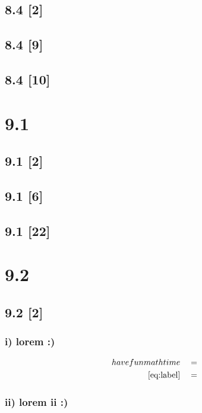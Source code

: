 \documentclass{article}
\begin{document}
\subsection*{8.4 [2]}
\subsection*{8.4 [9]}
\subsection*{8.4 [10]}

\newpage

\section*{9.1}
\setcounter{equation}{0}

\subsection*{9.1 [2]}
\subsection*{9.1 [6]}
\subsection*{9.1 [22]}

\newpage

\section*{9.2}
\setcounter{equation}{0}

\subsection*{9.2 [2]}

\subsubsection*{i) lorem :)}

\begin{align}
    \label{eq:label}
    have fun math time && &=
    \\
    \label{eq:label2}
    \eqref{eq:label} && &=
\end{align}
\subsubsection*{ii) lorem ii :)}
\end{document}
